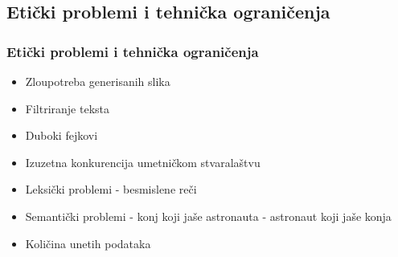 \documentclass{beamer}
\begin{document}
\begin{frame}[fragile]
\begin{figure}
    \qquad
 
    \label{fig:example}
    \end{figure}
\end{frame}

\subsection{Etički problemi i tehnička ograničenja}

\begin{frame}[fragile]\frametitle{Etički problemi i tehnička ograničenja}
	\begin{itemize}	
		\item Zloupotreba generisanih slika
		\item Filtriranje teksta
		\item Duboki fejkovi
		\item Izuzetna konkurencija umetničkom stvaralaštvu
		\item Leksički problemi - besmislene reči
		\item Semantički problemi - konj koji jaše astronauta - astronaut koji jaše konja
		\item Količina unetih podataka
	\end{itemize}
\end{frame}
\end{document}
